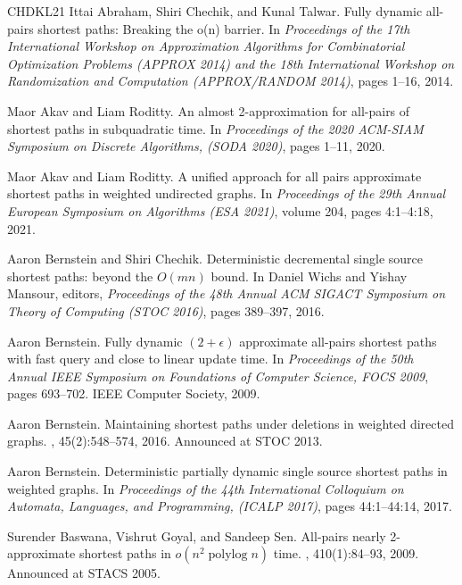 \documentclass[11pt]{article}
\theoremstyle{definition}
\theoremstyle{remark}
\begin{document}
\begin{titlepage}
\begin{thebibliography}{CHDKL21}
Ittai Abraham, Shiri Chechik, and Kunal Talwar.
\newblock Fully dynamic all-pairs shortest paths: Breaking the o(n) barrier.
\newblock In {\em Proceedings of the 17th International Workshop on
  Approximation Algorithms for Combinatorial Optimization Problems (APPROX
  2014) and the 18th International Workshop on Randomization and Computation
  ({APPROX/RANDOM} 2014)}, pages 1--16, 2014.

Maor Akav and Liam Roditty.
\newblock An almost 2-approximation for all-pairs of shortest paths in
  subquadratic time.
\newblock In {\em Proceedings of the 2020 {ACM-SIAM} Symposium on Discrete
  Algorithms, ({SODA} 2020)}, pages 1--11, 2020.

Maor Akav and Liam Roditty.
\newblock A unified approach for all pairs approximate shortest paths in
  weighted undirected graphs.
\newblock In {\em Proceedings of the 29th Annual European Symposium on
  Algorithms ({ESA} 2021)}, volume 204, pages 4:1--4:18, 2021.

Aaron Bernstein and Shiri Chechik.
\newblock Deterministic decremental single source shortest paths: beyond the
  {$O(mn)$} bound.
\newblock In Daniel Wichs and Yishay Mansour, editors, {\em Proceedings of the
  48th Annual {ACM} {SIGACT} Symposium on Theory of Computing ({STOC} 2016)},
  pages 389--397, 2016.

Aaron Bernstein.
\newblock Fully dynamic $(2 + \epsilon)$ approximate all-pairs shortest paths
  with fast query and close to linear update time.
\newblock In {\em Proceedings of the 50th Annual {IEEE} Symposium on
  Foundations of Computer Science, {FOCS} 2009}, pages 693--702. {IEEE}
  Computer Society, 2009.

Aaron Bernstein.
\newblock Maintaining shortest paths under deletions in weighted directed
  graphs.
, 45(2):548--574, 2016.
\newblock Announced at {STOC} 2013.

Aaron Bernstein.
\newblock Deterministic partially dynamic single source shortest paths in
  weighted graphs.
\newblock In {\em Proceedings of the 44th International Colloquium on Automata,
  Languages, and Programming, ({ICALP} 2017)}, pages 44:1--44:14, 2017.

Surender Baswana, Vishrut Goyal, and Sandeep Sen.
\newblock All-pairs nearly 2-approximate shortest paths in
  $o(n^2\operatorname{polylog}n)$ time.
, 410(1):84--93, 2009.
\newblock Announced at {STACS} 2005.


\end{thebibliography}
\end{titlepage}
\end{document}
